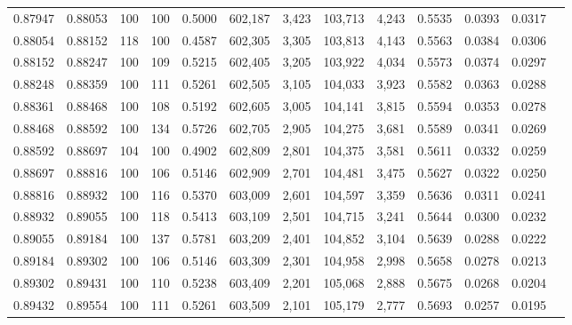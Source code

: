 \begin{tabular}{rrrrrrrrrrrrr}
0.87947 & 0.88053 &   100 & 100 &                                     0.5000 & 602,187 &   3,423 & 103,713 &   4,243 & 0.5535 & 0.0393 & 0.0317 \\
0.88054 & 0.88152 &   118 & 100 &                                     0.4587 & 602,305 &   3,305 & 103,813 &   4,143 & 0.5563 & 0.0384 & 0.0306 \\
0.88152 & 0.88247 &   100 & 109 &                                     0.5215 & 602,405 &   3,205 & 103,922 &   4,034 & 0.5573 & 0.0374 & 0.0297 \\
0.88248 & 0.88359 &   100 & 111 &                                     0.5261 & 602,505 &   3,105 & 104,033 &   3,923 & 0.5582 & 0.0363 & 0.0288 \\
0.88361 & 0.88468 &   100 & 108 &                                     0.5192 & 602,605 &   3,005 & 104,141 &   3,815 & 0.5594 & 0.0353 & 0.0278 \\
0.88468 & 0.88592 &   100 & 134 &                                     0.5726 & 602,705 &   2,905 & 104,275 &   3,681 & 0.5589 & 0.0341 & 0.0269 \\
0.88592 & 0.88697 &   104 & 100 &                                     0.4902 & 602,809 &   2,801 & 104,375 &   3,581 & 0.5611 & 0.0332 & 0.0259 \\
0.88697 & 0.88816 &   100 & 106 &                                     0.5146 & 602,909 &   2,701 & 104,481 &   3,475 & 0.5627 & 0.0322 & 0.0250 \\
0.88816 & 0.88932 &   100 & 116 &                                     0.5370 & 603,009 &   2,601 & 104,597 &   3,359 & 0.5636 & 0.0311 & 0.0241 \\
0.88932 & 0.89055 &   100 & 118 &                                     0.5413 & 603,109 &   2,501 & 104,715 &   3,241 & 0.5644 & 0.0300 & 0.0232 \\
0.89055 & 0.89184 &   100 & 137 &                                     0.5781 & 603,209 &   2,401 & 104,852 &   3,104 & 0.5639 & 0.0288 & 0.0222 \\
0.89184 & 0.89302 &   100 & 106 &                                     0.5146 & 603,309 &   2,301 & 104,958 &   2,998 & 0.5658 & 0.0278 & 0.0213 \\
0.89302 & 0.89431 &   100 & 110 &                                     0.5238 & 603,409 &   2,201 & 105,068 &   2,888 & 0.5675 & 0.0268 & 0.0204 \\
0.89432 & 0.89554 &   100 & 111 &                                     0.5261 & 603,509 &   2,101 & 105,179 &   2,777 & 0.5693 & 0.0257 & 0.0195 \\

\end{tabular}
